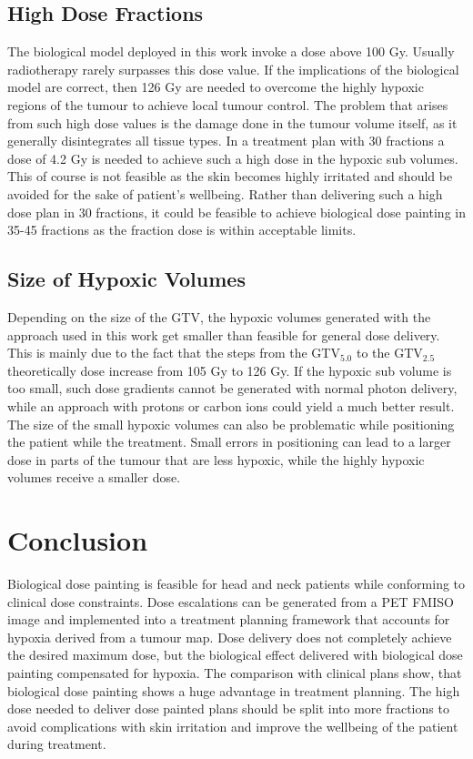 \subsection{High Dose Fractions}
The biological model deployed in this work invoke a dose above 100 Gy. Usually radiotherapy rarely surpasses this dose value. If the implications of the biological model are correct, then 126 Gy are needed to overcome the highly hypoxic regions of the tumour to achieve local tumour control. The problem that arises from such high dose values is the damage done in the tumour volume itself, as it generally disintegrates all tissue types. In a treatment plan with 30 fractions a dose of 4.2 Gy is needed to achieve such a high dose in the hypoxic sub volumes. This of course is not feasible as the skin becomes highly irritated and should be avoided for the sake of patient's wellbeing. Rather than delivering such a high dose plan in 30 fractions, it could be feasible to achieve biological dose painting in 35-45 fractions as the fraction dose is within acceptable limits.
\subsection{Size of Hypoxic Volumes}
Depending on the size of the GTV, the hypoxic volumes generated with the approach used in this work get smaller than feasible for general dose delivery. This is mainly due to the fact that the steps from the GTV$_{5.0}$ to the GTV$_{2.5}$ theoretically dose increase from 105 Gy to 126 Gy. If the hypoxic sub volume is too small, such dose gradients cannot be generated with normal photon delivery, while an approach with protons or carbon ions could yield a much better result. The size of the small hypoxic volumes can also be problematic while positioning the patient while the treatment. Small errors in positioning can lead to a larger dose in parts of the tumour that are less hypoxic, while the highly hypoxic volumes receive a smaller dose. 
\section{Conclusion}
Biological dose painting is feasible for head and neck patients while conforming to clinical dose constraints. Dose escalations can be generated from a PET FMISO image and implemented into a treatment planning framework that accounts for hypoxia derived from a tumour map. Dose delivery does not completely achieve the desired maximum dose, but the biological effect delivered with biological dose painting compensated for hypoxia. The comparison with clinical plans show, that biological dose painting shows a huge advantage in treatment planning. The high dose needed to deliver dose painted plans should be split into more fractions to avoid complications with skin irritation and improve the wellbeing of the patient during treatment.